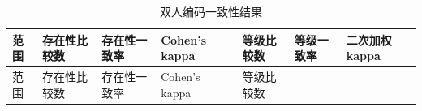 \documentclass[
  12pt,
  a4paper]{ctexbook}
\begin{document}
\begin{longtable}[]{@{}
  >{\raggedright\arraybackslash}p{}
  >{\raggedleft\arraybackslash}p{}
  >{\raggedleft\arraybackslash}p{}
  >{\raggedleft\arraybackslash}p{}
  >{\raggedleft\arraybackslash}p{}
  >{\raggedleft\arraybackslash}p{}
  >{\raggedleft\arraybackslash}p{}@{}}
\caption{双人编码一致性结果}\tabularnewline
\toprule\noalign{}
\rowcolor{ThesisPale}
\begin{minipage}[b]{\linewidth}\raggedright
范围
\end{minipage} & \begin{minipage}[b]{\linewidth}\raggedleft
存在性比较数
\end{minipage} & \begin{minipage}[b]{\linewidth}\raggedleft
存在性一致率
\end{minipage} & \begin{minipage}[b]{\linewidth}\raggedleft
Cohen's kappa
\end{minipage} & \begin{minipage}[b]{\linewidth}\raggedleft
等级比较数
\end{minipage} & \begin{minipage}[b]{\linewidth}\raggedleft
等级一致率
\end{minipage} & \begin{minipage}[b]{\linewidth}\raggedleft
二次加权kappa
\end{minipage} \\
\midrule\noalign{}
\endfirsthead
\toprule\noalign{}
\rowcolor{ThesisPale}
\begin{minipage}[b]{\linewidth}\raggedright
范围
\end{minipage} & \begin{minipage}[b]{\linewidth}\raggedleft
存在性比较数
\end{minipage} & \begin{minipage}[b]{\linewidth}\raggedleft
存在性一致率
\end{minipage} & \begin{minipage}[b]{\linewidth}\raggedleft
Cohen's kappa
\end{minipage} & \begin{minipage}[b]{\linewidth}\raggedleft
等级比较数
\end{minipage} & \begin{minipage}[b]{\linewidth}\raggedleft

\end{minipage}
\end{longtable}
\end{document}
